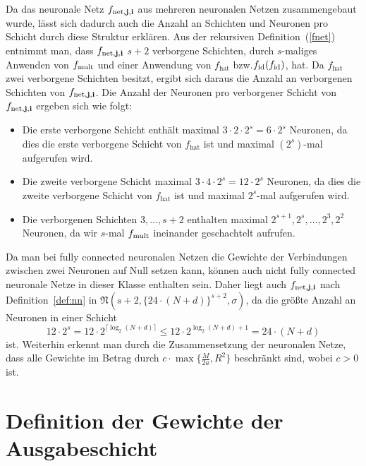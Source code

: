 Da das neuronale Netz $f_{\mathrm{net},\mathbf{j},\mathbf{i}}$ aus mehreren neuronalen Netzen zusammengebaut wurde, lässt sich dadurch auch die Anzahl an Schichten und Neuronen pro Schicht durch diese Struktur erklären. Aus der rekursiven Definition~(\ref{fnet}) entnimmt man, dass $f_{\mathrm{net},\mathbf{j},\mathbf{i}}$ $s + 2$ verborgene Schichten, durch $s$-maliges Anwenden von $f_{\mathrm{mult}}$ und einer Anwendung von $f_{\mathrm{hat}}$ bzw.\@ $f_{\mathrm{id}}(f_{\mathrm{id}})$, hat. Da $f_{\mathrm{hat}}$ zwei verborgene Schichten besitzt, ergibt sich daraus die Anzahl an verborgenen Schichten von $f_{\mathrm{net},\mathbf{j},\mathbf{i}}$.
Die Anzahl der Neuronen pro verborgener Schicht von $f_{\mathrm{net},\mathbf{j},\mathbf{i}}$ ergeben sich wie folgt:
\begin{itemize}
\item Die erste verborgene Schicht enthält maximal $3 \cdot 2 \cdot 2^s = 6 \cdot 2^s$ Neuronen, da dies die erste verborgene Schicht von $f_{\mathrm{hat}}$ ist und maximal $(2^s)$-mal aufgerufen wird. 
\item Die zweite verborgene Schicht maximal $3 \cdot 4 \cdot 2^s = 12\cdot 2^s$ Neuronen, da dies die zweite verborgene Schicht von $f_{\mathrm{hat}}$ ist und maximal $2^s$-mal aufgerufen wird.
\item Die verborgenen Schichten $3,\dots,s + 2$ enthalten maximal   $2^{s+ 1}, 2^s, \dots, 2^3, 2^2$ Neuronen, da wir $s$-mal $f_{\mathrm{mult}}$ ineinander geschachtelt aufrufen. 
\end{itemize}  
Da man bei fully connected neuronalen Netzen die Gewichte der Verbindungen zwischen zwei Neuronen auf Null setzen kann, können auch nicht fully connected neuronale Netze in dieser Klasse enthalten sein. Daher liegt auch $f_{\mathrm{net},\mathbf{j},\mathbf{i}}$ nach Definition~\ref{def:nn} in $\mathfrak{N}(s + 2,\{24 \cdot (N + d)\}^{s + 2},\sigma)$, da die größte Anzahl an Neuronen in einer Schicht $$12 \cdot 2^s = 12 \cdot 2^{\lceil\log_2(N + d)\rceil} \leq 12 \cdot 2^{\log_2(N + d) + 1} = 24 \cdot (N + d)$$ ist. Weiterhin erkennt man durch die Zusammensetzung der neuronalen Netze, dass alle Gewichte im Betrag durch $c \cdot \max\{\frac{M}{2a}, R^2\}$ beschränkt sind, wobei $c > 0$ ist. 

\section{Definition der Gewichte der Ausgabeschicht}
\label{subsec:2.2}

